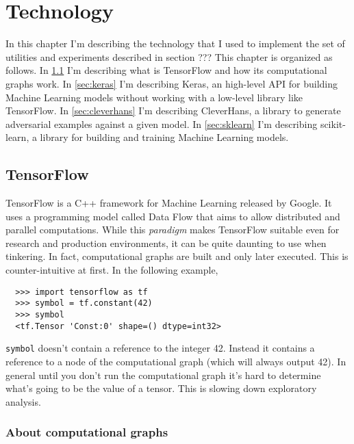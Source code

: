 \chapter{Technology}

In this chapter I'm describing the technology that I used to implement
the set of utilities and experiments described in section ??? This
chapter is organized as follows. In \ref{sec:tensorflow} I'm describing
what is TensorFlow and how its computational graphs work. In
\ref{sec:keras} I'm describing Keras, an high-level API for building
Machine Learning models without working with a low-level library like
TensorFlow. In \ref{sec:cleverhans} I'm describing CleverHans, a
library to generate adversarial examples against a given model. In
\ref{sec:sklearn} I'm describing scikit-learn, a library for building
and training Machine Learning models.

\section{TensorFlow}
\label{sec:tensorflow}

TensorFlow is a C++ framework for Machine Learning released by Google.
It uses a programming model called Data Flow that aims to allow
distributed and parallel computations. While this \emph{paradigm} makes
TensorFlow suitable even for research and production environments, it
can be quite daunting to use when tinkering. In fact, computational
graphs are built and only later executed. This is counter-intuitive at
first. In the following example,

\begin{verbatim}
  >>> import tensorflow as tf
  >>> symbol = tf.constant(42)
  >>> symbol 
  <tf.Tensor 'Const:0' shape=() dtype=int32>
\end{verbatim}

\texttt{symbol} doesn't contain a reference to the integer 42. Instead
it contains a reference to a node of the computational graph (which
will always output 42). In general until you don't run the
computational graph it's hard to determine what's going to be the value
of a tensor. This is slowing down exploratory analysis.

\subsection{About computational graphs}
\label{subsec:computational-graph}

